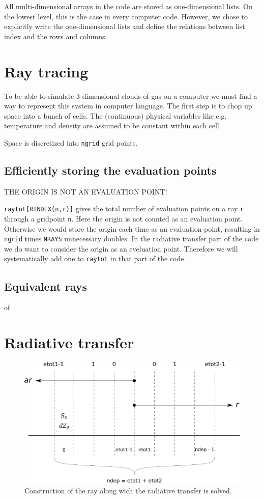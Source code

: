\documentclass[]{article}
\begin{document}
All multi-dimensional arrays in the code are stored as one-dimensional lists. On the lowest level, this is the case in every computer code. However, we chose to explicitly write the one-dimensional lists and define the relations between list index and the rows and columns.

\section{Ray tracing}

To be able to simulate 3-dimensional clouds of gas on a computer we must find a way to represent this system in computer language. The first step is to chop up space into a bunch of cells. The (continuous) physical variables like e.g. temperature and density are assumed to be constant within each cell.

\bigskip

Space is discretized into \texttt{ngrid} grid points.

\subsection{Efficiently storing the evaluation points}

THE ORIGIN IS NOT AN EVALUATION POINT!

\texttt{raytot[RINDEX(n,r)]} gives the total number of evaluation points on a ray \texttt{r} through a gridpoint \texttt{n}. Here the origin is not counted as an evaluation point. Otherwise we would store the origin each time as an evaluation point, resulting in \texttt{ngrid} times \texttt{NRAYS} unnecessary doubles. In the radiative transfer part of the code we do want to consider the origin as an eveluation point. Therefore we will systematically add one to \texttt{raytot} in that part of the code.

\subsection{Equivalent rays}
of

\section{Radiative transfer}

\begin{figure}[H]
	\centering
	\includegraphics[scale=.8]{Images/ray.pdf}
	\caption{Construction of the ray along wich the radiative transfer is solved.}
	\label{grid}
\end{figure}


\newpage



\end{document}
